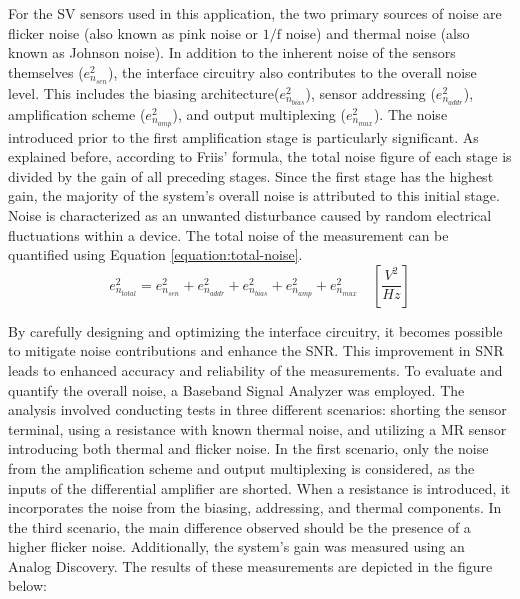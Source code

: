 For the \ac{SV} sensors used in this application, the two primary sources of noise are flicker noise (also known as pink noise or $\mathrm{1/f}$ noise) and thermal noise (also known as Johnson noise)\cite{freitas2007magnetoresistive}. In addition to the inherent noise of the sensors themselves ($e^2_{n_{sen}}$), the interface circuitry also contributes to the overall noise level. This includes the biasing architecture($e^2_{n_{bias}}$), sensor addressing ($e^2_{n_{addr}}$), amplification scheme ($e^2_{n_{amp}}$), and output multiplexing ($e^2_{n_{mux}}$). The noise introduced prior to the first amplification stage is particularly significant. As explained before, according to Friis' formula, the total noise figure of each stage is divided by the gain of all preceding stages. Since the first stage has the highest gain, the majority of the system's overall noise is attributed to this initial stage. Noise is characterized as an unwanted disturbance caused by random electrical fluctuations within a device. The total noise of the measurement can be quantified using Equation \ref{equation:total-noise}.
\begin{equation}
    e^2_{n_{total}} = e^2_{n_{sen}} + e^2_{n_{addr}} + e^2_{n_{bias}} + e^2_{n_{amp}} + e^2_{n_{mux}} \quad\left[\frac{V^2}{Hz}\right]
    \label{equation:total-noise}
\end{equation}

By carefully designing and optimizing the interface circuitry, it becomes possible to mitigate noise contributions and enhance the \ac{SNR}. This improvement in \ac{SNR} leads to enhanced accuracy and reliability of the measurements. To evaluate and quantify the overall noise, a Baseband Signal Analyzer was employed. The analysis involved conducting tests in three different scenarios: shorting the sensor terminal, using a resistance with known thermal noise, and utilizing a \ac{MR} sensor introducing both thermal and flicker noise. In the first scenario, only the noise from the amplification scheme and output multiplexing is considered, as the inputs of the differential amplifier are shorted. When a resistance is introduced, it incorporates the noise from the biasing, addressing, and thermal components. In the third scenario, the main difference observed should be the presence of a higher flicker noise. Additionally, the system's gain was measured using an Analog Discovery. The results of these measurements are depicted in the figure below:

